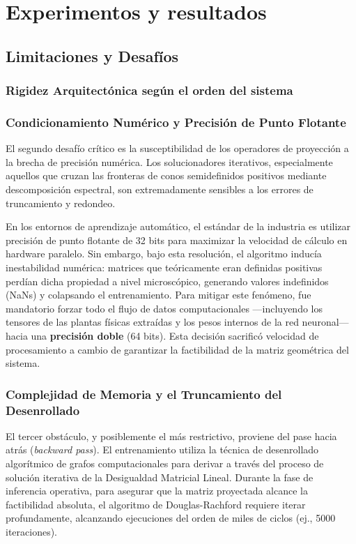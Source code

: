 \chapter{Experimentos y resultados}
	\label{sec:experimentos}



\section{Limitaciones y Desafíos}
\label{sec:limitaciones_experimentos}



\subsection{Rigidez Arquitectónica según el orden del sistema}


\subsection{Condicionamiento Numérico y Precisión de Punto Flotante}
El segundo desafío crítico es la susceptibilidad de los operadores de proyección a la brecha de precisión numérica. Los solucionadores iterativos, especialmente aquellos que cruzan las fronteras de conos semidefinidos positivos mediante descomposición espectral, son extremadamente sensibles a los errores de truncamiento y redondeo. 

En los entornos de aprendizaje automático, el estándar de la industria es utilizar precisión de punto flotante de 32 bits para maximizar la velocidad de cálculo en hardware paralelo. Sin embargo, bajo esta resolución, el algoritmo inducía inestabilidad numérica: matrices que teóricamente eran definidas positivas perdían dicha propiedad a nivel microscópico, generando valores indefinidos (NaNs) y colapsando el entrenamiento. Para mitigar este fenómeno, fue mandatorio forzar todo el flujo de datos computacionales —incluyendo los tensores de las plantas físicas extraídas y los pesos internos de la red neuronal— hacia una \textbf{precisión doble} (64 bits). Esta decisión sacrificó velocidad de procesamiento a cambio de garantizar la factibilidad de la matriz geométrica del sistema.

\subsection{Complejidad de Memoria y el Truncamiento del Desenrollado}
El tercer obstáculo, y posiblemente el más restrictivo, proviene del pase hacia atrás (\textit{backward pass}). El entrenamiento utiliza la técnica de desenrollado algorítmico de grafos computacionales para derivar a través del proceso de solución iterativa de la Desigualdad Matricial Lineal. Durante la fase de inferencia operativa, para asegurar que la matriz proyectada alcance la factibilidad absoluta, el algoritmo de Douglas-Rachford requiere iterar profundamente, alcanzando ejecuciones del orden de miles de ciclos (ej., 5000 iteraciones).

